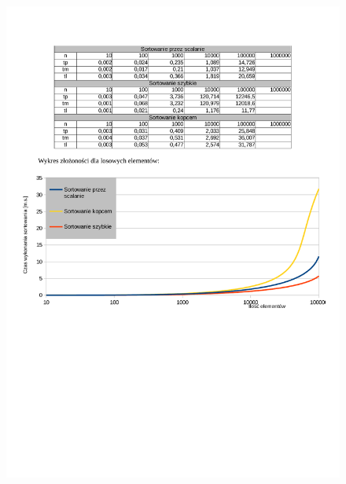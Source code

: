 \documentclass{article}
\begin{document}
\begin{flushleft}
\begin{figure}[H]
\includegraphics[width=\textwidth]{sort_czas1.pdf}
\label{fig:sort_czas1.pdf}
\end{figure}


\end{flushleft}
\end{document}
